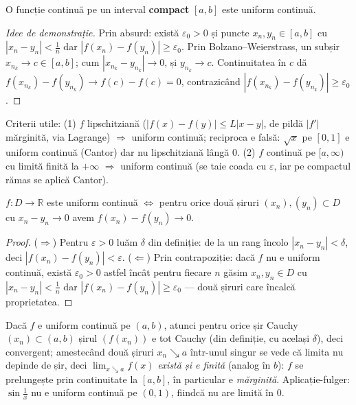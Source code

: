\begin{teorema}[Cantor]
O funcție continuă pe un interval \textbf{compact} $[a,b]$ este uniform continuă.
\end{teorema}
\begin{proof}[Idee de demonstrație]
Prin absurd: există $\varepsilon_0>0$ și puncte $x_n,y_n\in[a,b]$ cu $|x_n-y_n|<\frac1n$ dar $|f(x_n)-f(y_n)|\ge\varepsilon_0$. Prin Bolzano--Weierstrass, un subșir $x_{n_k}\to c\in[a,b]$; cum $|x_{n_k}-y_{n_k}|\to0$, și $y_{n_k}\to c$. Continuitatea în $c$ dă $f(x_{n_k})-f(y_{n_k})\to f(c)-f(c)=0$, contrazicând $|f(x_{n_k})-f(y_{n_k})|\ge\varepsilon_0$.
\end{proof}

\begin{obs}
Criterii utile: (1) $f$ lipschitziană ($|f(x)-f(y)|\le L|x-y|$, de pildă $|f'|$ mărginită, via Lagrange) $\Rightarrow$ uniform continuă; reciproca e falsă: $\sqrt x$ pe $[0,1]$ e uniform continuă (Cantor) dar nu lipschitziană lângă $0$. (2) $f$ continuă pe $[a,\infty)$ cu limită finită la $+\infty$ $\Rightarrow$ uniform continuă (se taie coada cu $\varepsilon$, iar pe compactul rămas se aplică Cantor).
\end{obs}

\begin{propozitie}
$f:D\to\mathbb{R}$ este uniform continuă $\iff$ pentru orice două șiruri $(x_n),(y_n)\subset D$ cu $x_n-y_n\to0$ avem $f(x_n)-f(y_n)\to0$.
\end{propozitie}
\begin{proof}
($\Rightarrow$) Pentru $\varepsilon>0$ luăm $\delta$ din definiție: de la un rang încolo $|x_n-y_n|<\delta$, deci $|f(x_n)-f(y_n)|<\varepsilon$. ($\Leftarrow$) Prin contrapoziție: dacă $f$ nu e uniform continuă, există $\varepsilon_0>0$ astfel încât pentru fiecare $n$ găsim $x_n,y_n\in D$ cu $|x_n-y_n|<\frac1n$ dar $|f(x_n)-f(y_n)|\ge\varepsilon_0$ --- două șiruri care încalcă proprietatea.
\end{proof}

\begin{obs}
Dacă $f$ e uniform continuă pe $(a,b)$, atunci pentru orice șir Cauchy $(x_n)\subset(a,b)$ șirul $(f(x_n))$ e tot Cauchy (din definiție, cu același $\delta$), deci convergent; amestecând două șiruri $x_n\searrow a$ într-unul singur se vede că limita nu depinde de șir, deci $\lim_{x\searrow a}f(x)$ \emph{există și e finită} (analog în $b$): $f$ se prelungește prin continuitate la $[a,b]$, în particular e \emph{mărginită}. Aplicație-fulger: $\sin\frac1x$ nu e uniform continuă pe $(0,1)$, fiindcă nu are limită în $0$.
\end{obs}

